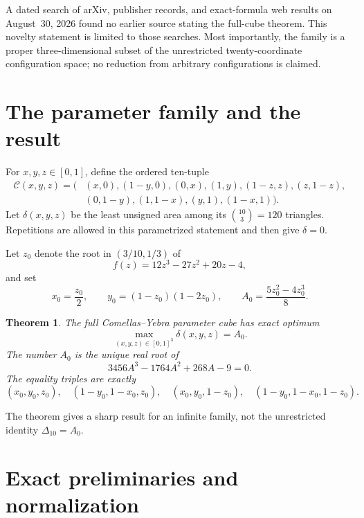 \documentclass[11pt]{amsart}
\newtheorem{theorem}{Theorem}[section]
\theoremstyle{definition}
\newcommand{\CY}{\mathcal C}
\begin{document}
A dated search of arXiv, publisher records, and exact-formula web results on
August~30, 2026 found no earlier source stating the full-cube theorem.  This
novelty statement is limited to those searches.  Most importantly, the family
is a proper three-dimensional subset of the unrestricted twenty-coordinate
configuration space; no reduction from arbitrary configurations is claimed.

\section{The parameter family and the result}

For $x,y,z\in[0,1]$, define the ordered ten-tuple
\begin{equation}\label{eq:family}
\begin{split}
\CY(x,y,z)=(&(x,0),(1-y,0),(0,x),(1,y),(1-z,z),(z,1-z),\\
 &(0,1-y),(1,1-x),(y,1),(1-x,1)).
\end{split}
\end{equation}
Let $\delta(x,y,z)$ be the least unsigned area among its $\binom{10}{3}=120$
triangles.  Repetitions are allowed in this parametrized statement and then
give $\delta=0$.

Let $z_0$ denote the root in $(3/10,1/3)$ of
\begin{equation}\label{eq:cubic}
 f(z)=12z^3-27z^2+20z-4,
\end{equation}
and set
\begin{equation}\label{eq:target}
 x_0=\frac{z_0}{2},\qquad
 y_0=(1-z_0)(1-2z_0),\qquad
 A_0=\frac{5z_0^2-4z_0^3}{8}.
\end{equation}

\begin{theorem}\label{thm:main}
The full Comellas--Yebra parameter cube has exact optimum
\[
 \max_{(x,y,z)\in[0,1]^3}\delta(x,y,z)=A_0.
\]
The number $A_0$ is the unique real root of
\[
 3456A^3-1764A^2+268A-9=0.
\]
The equality triples are exactly
\[
 (x_0,y_0,z_0),\quad (1-y_0,1-x_0,z_0),\quad
 (x_0,y_0,1-z_0),\quad (1-y_0,1-x_0,1-z_0).
\]
\end{theorem}

The theorem gives a sharp result for an infinite family, not the unrestricted
identity $\Delta_{10}=A_0$.

\section{Exact preliminaries and normalization}
\end{document}
